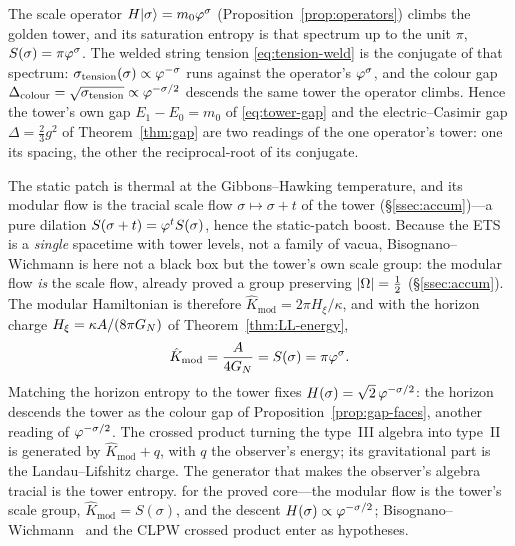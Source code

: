 \begin{proposition}\label{prop:gap-faces}
The scale operator $H\lvert\sigma\rangle=m_0\varphi^{\sigma}$ (Proposition~\ref{prop:operators}) climbs the golden tower, and its saturation entropy is that spectrum up to the unit $\pi$, $S(\sigma)=\pi\varphi^{\sigma}$. The welded string tension \eqref{eq:tension-weld} is the conjugate of that spectrum: $\sigma_{\mathrm{tension}}(\sigma)\propto\varphi^{-\sigma}$ runs against the operator's $\varphi^{\sigma}$, and the colour gap $\Delta_{\mathrm{colour}}=\sqrt{\sigma_{\mathrm{tension}}}\propto\varphi^{-\sigma/2}$ descends the same tower the operator climbs. Hence the tower's own gap $E_1-E_0=m_0$ of \eqref{eq:tower-gap} and the electric--Casimir gap $\Delta=\tfrac23 g^2$ of Theorem~\ref{thm:gap} are two readings of the one operator's tower: one its spacing, the other the reciprocal-root of its conjugate.

\end{proposition}

\begin{theorem}\label{thm:modular-LL}
The static patch is thermal at the Gibbons--Hawking temperature, and its modular flow is the tracial scale flow $\sigma\mapsto\sigma+t$ of the tower (\S\ref{ssec:accum})---a pure dilation $S(\sigma+t)=\varphi^{t}S(\sigma)$, hence the static-patch boost. Because the ETS is a \emph{single} spacetime with tower levels, not a family of vacua, Bisognano--Wichmann is here not a black box but the tower's own scale group: the modular flow \emph{is} the scale flow, already proved a group preserving $\lvert\Omega\rvert=\tfrac12$ (\S\ref{ssec:accum}). The modular Hamiltonian is therefore $\hat K_{\mathrm{mod}}=2\pi H_\xi/\kappa$, and with the horizon charge $H_\xi=\kappa A/(8\pi G_{N})$ of Theorem~\ref{thm:LL-energy},
\[
  \hat K_{\mathrm{mod}}=\frac{A}{4G_{N}}=S(\sigma)=\pi\varphi^{\sigma}.
\]
Matching the horizon entropy to the tower fixes $H(\sigma)=\sqrt2\,\varphi^{-\sigma/2}$: the horizon descends the tower as the colour gap of Proposition~\ref{prop:gap-faces}, another reading of $\varphi^{-\sigma/2}$. The crossed product turning the type~III algebra into type~II~\cite{CLPW22} is generated by $\hat K_{\mathrm{mod}}+q$, with $q$ the observer's energy; its gravitational part is the Landau--Lifshitz charge. The generator that makes the observer's algebra tracial is the tower entropy.
for the proved core---the modular flow is the tower's scale group, $\hat K_{\mathrm{mod}}=S(\sigma)$, and the descent $H(\sigma)\propto\varphi^{-\sigma/2}$; Bisognano--Wichmann~\cite{BisognanoWichmann75} and the CLPW crossed product enter as hypotheses.

\end{theorem}

